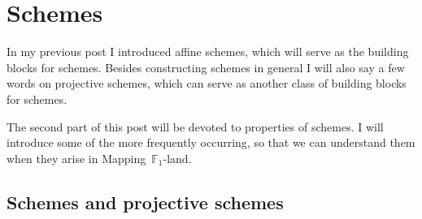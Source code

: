\section{Schemes}

In my previous post I introduced affine schemes, which will serve as the building blocks for schemes. Besides constructing schemes in general I will also say a few words on projective schemes, which can serve as another class of building blocks for schemes.

The second part of this post will be devoted to properties of schemes. I will introduce some of the more frequently occurring, so that we can understand them when they arise in \iftex\cite{mapping-fun}\fi\ifblog Mapping~$\mathbb{F}_1$-land\fi.

\subsection{Schemes and projective schemes}
